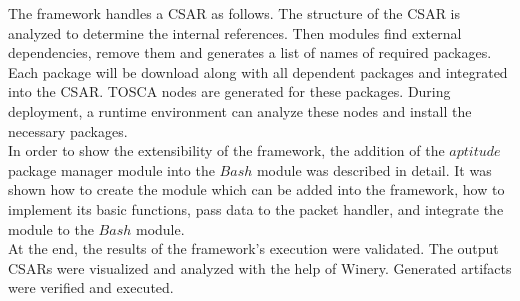 The framework handles a CSAR as follows.
The structure of the CSAR is analyzed to determine the internal references.
Then modules find external dependencies, remove them and generates a list of names of required packages.
Each package will be download along with all dependent packages and integrated into the CSAR. 
TOSCA nodes are generated for these packages.
During deployment, a runtime environment can analyze these nodes and install the necessary packages.\\
In order to show the extensibility of the framework, the addition of the $aptitude$ package manager module into the $Bash$ module was described in detail.
It  was shown how to create the module which can be added into the framework, how to implement its basic functions, pass data to the packet handler, and integrate the module to the $Bash$ module. \\
At the end, the results of the framework's execution were validated.
The output CSARs were visualized and analyzed with the help of Winery.
Generated artifacts were verified and executed.
